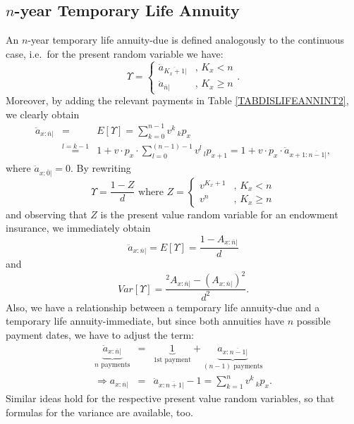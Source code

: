 \documentclass[11pt,fleqn,oneside]{book}
\begin{document}
\subsection*{$n$-year Temporary Life Annuity}
An $n$-year temporary life annuity-due is defined analogously to the continuous case, i.e.\ for the present random variable we have:
$$
\Upsilon = \left\{\begin{array}{cl}
\ddot{a}_{\overline{K_x+1}|} &,\,K_x<n\\
\ddot{a}_{\overline{n}|} &,\,K_x \geq n
\end{array}\right. .
$$
Moreover, by adding the relevant payments in Table \ref{TABDISLIFEANNINT2}, we clearly obtain
\begin{eqnarray*}
\ddot{a}_{x:\overline{n}|} &=& E[\Upsilon] = \sum_{k=0}^{n-1} v^k\,{_kp_x}\\
&\stackrel{l=k-1}{=}& 1 + v\cdot p_x \cdot \sum_{l=0}^{(n-1)-1} v^l\,{_lp_{x+1}} = 1 + v\cdot p_x \cdot 
\ddot{a}_{x+1:\overline{n-1}|},
\end{eqnarray*}
where $\ddot{a}_{x:\overline{0}|}=0$. By rewriting
$$
\Upsilon = \frac{1-Z}{d} \text{ where }Z = \left\{\begin{array}{cl}
v^{K_x+1} &,\,K_x<n\\
v^{n} &,\,K_x \geq n
\end{array}\right.
$$
and observing that $Z$ is the present value random variable for an endowment insurance, we immediately obtain 
$$
\ddot{a}_{x:\overline{n}|}  = E[\Upsilon] = \frac{1 - A_{x:\overline{n}|} }{d}
$$
and
$$
Var[\Upsilon] = \frac{{^2A_{x:\overline{n}|}} - \left(A_{x:\overline{n}|}\right)^2 }{d^2}.
$$
Also, we have a relationship between a temporary life annuity-due and a temporary life annuity-immediate, but since both annuities have $n$ possible payment dates, we have to adjust the term:
\begin{eqnarray*}
\underbrace{\ddot{a}_{x:\overline{n}|} }_{n \text{ payments}} &=& \underbrace{1}_{1\text{st payment}} +
\underbrace{a_{x:\overline{n-1}|} }_{(n-1) \text{ payments}}\\
\Rightarrow a_{x:\overline{n}|} &=& \ddot{a}_{x:\overline{n+1}|} - 1 = \sum_{k=1}^n v^k\,{_kp_x}.
\end{eqnarray*}
Similar ideas hold for the respective present value random variables, so that formulas for the variance are available, too.
\end{document}
